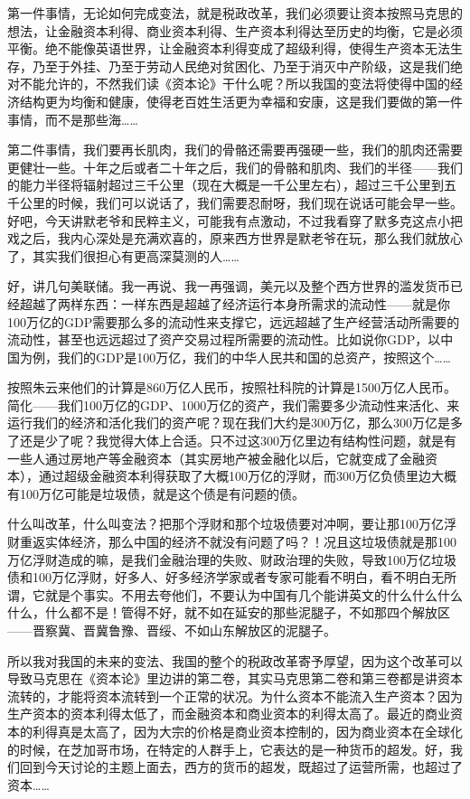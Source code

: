 \documentclass[UTF8, 12pt, a4paper]{ctexrep}
\begin{document}
第一件事情，无论如何完成变法，就是税政改革，我们必须要让资本按照马克思的想法，让金融资本利得、商业资本利得、生产资本利得达至历史的均衡，它是必须平衡。绝不能像英语世界，让金融资本利得变成了超级利得，使得生产资本无法生存，乃至于外挂、乃至于劳动人民绝对贫困化、乃至于消灭中产阶级，这是我们绝对不能允许的，不然我们读《资本论》干什么呢？所以我国的变法将使得中国的经济结构更为均衡和健康，使得老百姓生活更为幸福和安康，这是我们要做的第一件事情，而不是那些海……

第二件事情，我们要再长肌肉，我们的骨骼还需要再强硬一些，我们的肌肉还需要更健壮一些。十年之后或者二十年之后，我们的骨骼和肌肉、我们的半径——我们的能力半径将辐射超过三千公里（现在大概是一千公里左右），超过三千公里到五千公里的时候，我们可以说话了，我们需要忍耐呀，我们现在说话可能会早一些。好吧，今天讲默老爷和民粹主义，可能我有点激动，不过我看穿了默多克这点小把戏之后，我内心深处是充满欢喜的，原来西方世界是默老爷在玩，那么我们就放心了，其实我们很担心有更高深莫测的人……

好，讲几句美联储。我一再说、我一再强调，美元以及整个西方世界的滥发货币已经超越了两样东西：一样东西是超越了经济运行本身所需求的流动性——就是你100万亿的GDP需要那么多的流动性来支撑它，远远超越了生产经营活动所需要的流动性，甚至也远远超过了资产交易过程所需要的流动性。比如说你GDP，以中国为例，我们的GDP是100万亿，我们的中华人民共和国的总资产，按照这个……

按照朱云来他们的计算是860万亿人民币，按照社科院的计算是1500万亿人民币。简化——我们100万亿的GDP、1000万亿的资产，我们需要多少流动性来活化、来运行我们的经济和活化我们的资产呢？现在我们大约是300万亿，那么300万亿是多了还是少了呢？我觉得大体上合适。只不过这300万亿里边有结构性问题，就是有一些人通过房地产等金融资本（其实房地产被金融化以后，它就变成了金融资本），通过超级金融资本利得获取了大概100万亿的浮财，而300万亿负债里边大概有100万亿可能是垃圾债，就是这个债是有问题的债。

什么叫改革，什么叫变法？把那个浮财和那个垃圾债要对冲啊，要让那100万亿浮财重返实体经济，那么中国的经济不就没有问题了吗？！况且这垃圾债就是那100万亿浮财造成的嘛，是我们金融治理的失败、财政治理的失败，导致100万亿垃圾债和100万亿浮财，好多人、好多经济学家或者专家可能看不明白，看不明白无所谓，它就是个事实。不用去夸他们，不要认为中国有几个能讲英文的什么什么什么什么，什么都不是！管得不好，就不如在延安的那些泥腿子，不如那四个解放区——晋察冀、晋冀鲁豫、晋绥、不如山东解放区的泥腿子。

所以我对我国的未来的变法、我国的整个的税政改革寄予厚望，因为这个改革可以导致马克思在《资本论》里边讲的第二卷，其实马克思第二卷和第三卷都是讲资本流转的，才能将资本流转到一个正常的状况。为什么资本不能流入生产资本？因为生产资本的资本利得太低了，而金融资本和商业资本的利得太高了。最近的商业资本的利得真是太高了，因为大宗的价格是商业资本控制的，因为商业资本在全球化的时候，在芝加哥市场，在特定的人群手上，它表达的是一种货币的超发。好，我们回到今天讨论的主题上面去，西方的货币的超发，既超过了运营所需，也超过了资本……
\end{document}

